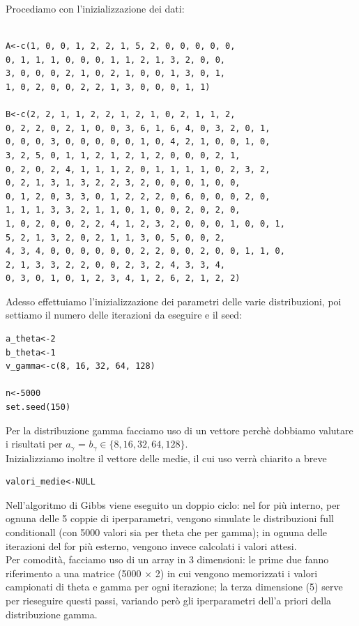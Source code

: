 \begin{enumerate}
Procediamo con l'inizializzazione dei dati:
\begin{lstlisting}[style=R]

A<-c(1, 0, 0, 1, 2, 2, 1, 5, 2, 0, 0, 0, 0, 0,
0, 1, 1, 1, 0, 0, 0, 1, 1, 2, 1, 3, 2, 0, 0,
3, 0, 0, 0, 2, 1, 0, 2, 1, 0, 0, 1, 3, 0, 1,
1, 0, 2, 0, 0, 2, 2, 1, 3, 0, 0, 0, 1, 1)

B<-c(2, 2, 1, 1, 2, 2, 1, 2, 1, 0, 2, 1, 1, 2,
0, 2, 2, 0, 2, 1, 0, 0, 3, 6, 1, 6, 4, 0, 3, 2, 0, 1,
0, 0, 0, 3, 0, 0, 0, 0, 0, 1, 0, 4, 2, 1, 0, 0, 1, 0,
3, 2, 5, 0, 1, 1, 2, 1, 2, 1, 2, 0, 0, 0, 2, 1,
0, 2, 0, 2, 4, 1, 1, 1, 2, 0, 1, 1, 1, 1, 0, 2, 3, 2,
0, 2, 1, 3, 1, 3, 2, 2, 3, 2, 0, 0, 0, 1, 0, 0,
0, 1, 2, 0, 3, 3, 0, 1, 2, 2, 2, 0, 6, 0, 0, 0, 2, 0,
1, 1, 1, 3, 3, 2, 1, 1, 0, 1, 0, 0, 2, 0, 2, 0,
1, 0, 2, 0, 0, 2, 2, 4, 1, 2, 3, 2, 0, 0, 0, 1, 0, 0, 1,
5, 2, 1, 3, 2, 0, 2, 1, 1, 3, 0, 5, 0, 0, 2,
4, 3, 4, 0, 0, 0, 0, 0, 0, 2, 2, 0, 0, 2, 0, 0, 1, 1, 0,
2, 1, 3, 3, 2, 2, 0, 0, 2, 3, 2, 4, 3, 3, 4,
0, 3, 0, 1, 0, 1, 2, 3, 4, 1, 2, 6, 2, 1, 2, 2)

\end{lstlisting}

Adesso effettuiamo l'inizializzazione dei parametri delle varie distribuzioni, poi settiamo il numero delle iterazioni da eseguire e il seed:

\begin{lstlisting}[style=R]
a_theta<-2
b_theta<-1
v_gamma<-c(8, 16, 32, 64, 128)

n<-5000
set.seed(150)
\end{lstlisting}

Per la distribuzione gamma facciamo uso di un vettore perchè dobbiamo valutare i risultati per $a_\gamma$ = $b_\gamma \in \lbrace 8, 16, 32, 64, 128 \rbrace $.\\
Inizializziamo inoltre il vettore delle medie, il cui uso verrà chiarito a breve
\begin{lstlisting}[style=R]
valori_medie<-NULL
\end{lstlisting}

Nell'algoritmo di Gibbs viene eseguito un doppio ciclo: nel for più interno, per ognuna delle 5 coppie di iperparametri, vengono simulate le distribuzioni full conditionall (con 5000 valori sia per theta che per gamma); in ognuna delle iterazioni del for più esterno, vengono invece calcolati i valori attesi. \\
Per comodità, facciamo uso di un array in 3 dimensioni: le prime due fanno riferimento a una matrice (5000 $\times$ 2) in cui vengono memorizzati i valori campionati di theta e gamma per ogni iterazione; la terza dimensione (5) serve per rieseguire questi passi, variando però gli iperparametri dell'a priori della distribuzione gamma.


\end{enumerate}
